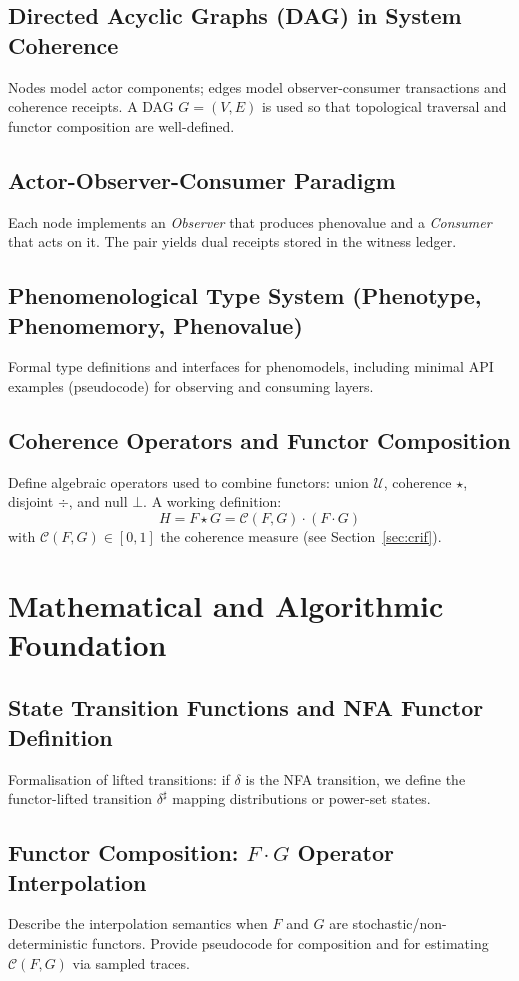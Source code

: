 \documentclass[12pt,a4paper]{article}
\begin{document}
\subsection{Directed Acyclic Graphs (DAG) in System Coherence}
Nodes model actor components; edges model observer-consumer transactions and
coherence receipts. A DAG $G=(V,E)$ is used so that topological traversal
and functor composition are well-defined.

\subsection{Actor-Observer-Consumer Paradigm}
Each node implements an \emph{Observer} that produces phenovalue and a
\emph{Consumer} that acts on it. The pair yields dual receipts stored in the
witness ledger.

\subsection{Phenomenological Type System (Phenotype, Phenomemory, Phenovalue)}
Formal type definitions and interfaces for phenomodels, including minimal
API examples (pseudocode) for observing and consuming layers.

\subsection{Coherence Operators and Functor Composition}
\label{sec:coherence-operators}
Define algebraic operators used to combine functors: union $\mathcal{U}$,
coherence $\star$, disjoint $\div$, and null $\bot$. A working definition:
\[ H = F\star G = \mathcal{C}(F,G)\cdot (F\cdot G) \]
with $\mathcal{C}(F,G)\in[0,1]$ the coherence measure (see Section~\ref{sec:crif}).

\section{Mathematical and Algorithmic Foundation}
\subsection{State Transition Functions and NFA Functor Definition}
Formalisation of lifted transitions: if $\delta$ is the NFA transition,
we define the functor-lifted transition $\delta^\sharp$ mapping distributions
or power-set states.

\subsection{Functor Composition: \texorpdfstring{$F \cdot G$}{F.G} Operator Interpolation}
Describe the interpolation semantics when $F$ and $G$ are stochastic/non-
deterministic functors. Provide pseudocode for composition and for estimating
$\mathcal{C}(F,G)$ via sampled traces.
\end{document}
